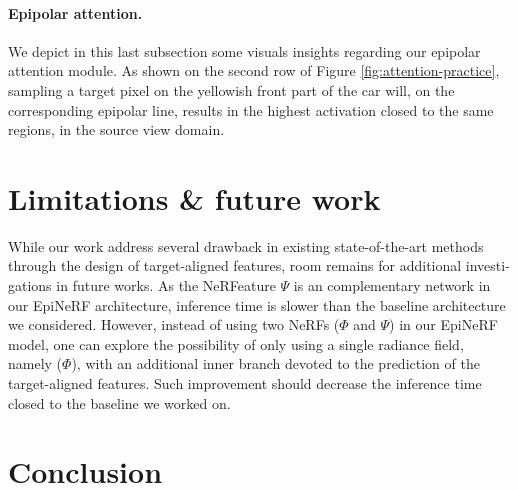 \paragraph{Epipolar attention.}
We depict in this last subsection some visuals insights regarding our epipolar attention module. As shown on the second row of Figure \ref{fig:attention-practice}, sampling a target pixel on the yellowish front part of the car will, on the corresponding epipolar line, results in the highest activation closed to the same regions, in the source view domain. 

\section{Limitations \& future work}
While our work address several drawback in existing state-of-the-art methods through the design of target-aligned features, room remains for additional investi\--gations in future works. As the NeRFeature $\Psi$ is an complementary network in our EpiNeRF architecture, inference time is slower than the baseline architecture we considered. However, instead of using two NeRFs ($\Phi$ and $\Psi$) in our EpiNeRF model, one can explore the possibility of only using a single radiance field, namely ($\Phi$), with an additional inner branch devoted to the prediction of the target-aligned features. Such improvement should decrease the inference time closed to the baseline we worked on. 


\section{Conclusion}

